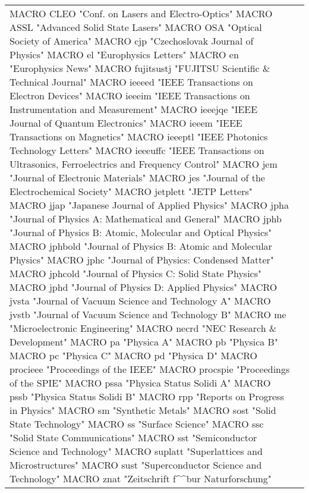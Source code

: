 \documentclass{article}
\begin{document}
\begin{longtable}{lp{6cm}}
MACRO {CLEO} {"Conf. on Lasers and Electro-Optics"}
MACRO {ASSL} {"Advanced Solid State Lasers"}
MACRO {OSA}  {"Optical Society of America"}
MACRO {cjp} {"Czechoslovak Journal of Physics"}
MACRO {el} {"Europhysics Letters"}
MACRO {en} {"Europhysics News"}
MACRO {fujitsustj} {"FUJITSU Scientific {\&} Technical Journal"}
MACRO {ieeeed} {"IEEE Transactions on Electron Devices"}
MACRO {ieeeim} {"IEEE Transactions on Instrumentation and Measurement"}
MACRO {ieeejqe} {"IEEE Journal of Quantum Electronics"}
MACRO {ieeem} {"IEEE Transactions on Magnetics"}
MACRO {ieeeptl} {"IEEE Photonics Technology Letters"}
MACRO {ieeeuffc} {"IEEE Transactions on Ultrasonics, Ferroelectrics and Frequency Control"}
MACRO {jem} {"Journal of Electronic Materials"}
MACRO {jes} {"Journal of the Electrochemical Society"}
MACRO {jetplett} {"JETP Letters"}
MACRO {jjap} {"Japanese Journal of Applied Physics"}
MACRO {jpha} {"Journal of Physics A: Mathematical and General"}
MACRO {jphb} {"Journal of Physics B: Atomic, Molecular and Optical Physics"}
MACRO {jphbold} {"Journal of Physics B: Atomic and Molecular Physics"}
MACRO {jphc} {"Journal of Physics: Condensed Matter"}
MACRO {jphcold} {"Journal of Physics C: Solid State Physics"}
MACRO {jphd} {"Journal of Physics D: Applied Physics"}
MACRO {jvsta} {"Journal of Vacuum Science and Technology A"}
MACRO {jvstb} {"Journal of Vacuum Science and Technology B"}
MACRO {me} {"Microelectronic Engineering"}
MACRO {necrd} {"NEC Research {\&} Development"}
MACRO {pa} {"Physica A"}
MACRO {pb} {"Physica B"}
MACRO {pc} {"Physica C"}
MACRO {pd} {"Physica D"}
MACRO {procieee} {"Proceedings of the IEEE"}
MACRO {procspie} {"Proceedings of the SPIE"}
MACRO {pssa} {"Physica Status Solidi A"}
MACRO {pssb} {"Physica Status Solidi B"}
MACRO {rpp} {"Reports on Progress in Physics"}
MACRO {sm} {"Synthetic Metals"}
MACRO {sost} {"Solid State Technology"}
MACRO {ss} {"Surface Science"}
MACRO {ssc} {"Solid State Communications"}
MACRO {sst} {"Semiconductor Science and Technology"}
MACRO {suplatt} {"Superlattices and Microstructures"}
MACRO {sust} {"Superconductor Science and Technology"}
MACRO {znat} {"Zeitschrift f\^^b{u}r Naturforschung"}
\end{longtable}
\endgroup
\end{document}
